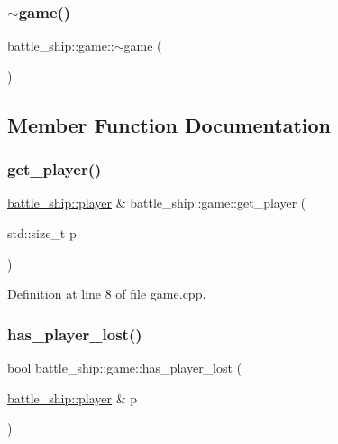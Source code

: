 \subsubsection{\texorpdfstring{$\sim$game()}{~game()}}
{\footnotesize\ttfamily battle\+\_\+ship\+::game\+::$\sim$game (\begin{DoxyParamCaption}{ }\end{DoxyParamCaption})\hspace{0.3cm}{\ttfamily [default]}}



\subsection{Member Function Documentation}
\mbox{\label{classbattle__ship_1_1game_abdbbd12c9a8b272e2a9fabed8ea90922}} 
\subsubsection{\texorpdfstring{get\+\_\+player()}{get\_player()}}
{\footnotesize\ttfamily \hyperlink{classbattle__ship_1_1player}{battle\+\_\+ship\+::player} \& battle\+\_\+ship\+::game\+::get\+\_\+player (\begin{DoxyParamCaption}\item[{std\+::size\+\_\+t}]{p }\end{DoxyParamCaption})}



Definition at line 8 of file game.\+cpp.

\mbox{\label{classbattle__ship_1_1game_a2f6eceb02db97507f52e08c1dafcf5e4}} 
\subsubsection{\texorpdfstring{has\+\_\+player\+\_\+lost()}{has\_player\_lost()}}
{\footnotesize\ttfamily bool battle\+\_\+ship\+::game\+::has\+\_\+player\+\_\+lost (\begin{DoxyParamCaption}\item[{\hyperlink{classbattle__ship_1_1player}{battle\+\_\+ship\+::player} \&}]{p }\end{DoxyParamCaption})}



